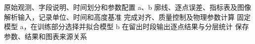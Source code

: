 \begin{algorithm}[H]\caption{大气湍流强度计算流程}
\begin{algorithmic}[1]
\REQUIRE 原始观测、字段说明、时间划分和参数配置
\ENSURE a、b 廓线、逐点误差、指标表及图像
\STATE 解析输入，记录单位、时间和高度基准
\STATE 完成对齐、质量控制及物理参数计算
\STATE 固定模型 a，在训练部分选择并拟合模型 b
\STATE 在留出时段输出逐点结果与分层统计
\STATE 保存参数、结果和图表来源关系
\end{algorithmic}\end{algorithm}
